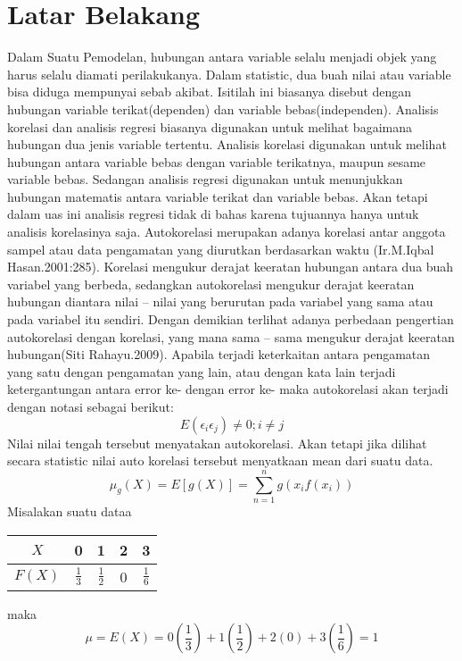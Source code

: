 \documentclass[conference]{IEEEtran}
\begin{document}
\section{Latar Belakang}
Dalam Suatu Pemodelan, hubungan antara variable selalu menjadi objek yang harus selalu diamati perilakukanya. Dalam statistic, dua buah nilai atau variable bisa diduga mempunyai sebab akibat. Isitilah ini biasanya disebut dengan hubungan variable terikat(dependen) dan variable bebas(independen). 
Analisis korelasi dan analisis regresi biasanya digunakan untuk melihat bagaimana hubungan dua jenis variable tertentu. Analisis korelasi digunakan untuk melihat hubungan antara variable bebas dengan variable terikatnya, maupun sesame variable bebas. Sedangan analisis regresi digunakan untuk menunjukkan hubungan matematis antara variable terikat dan variable bebas. Akan tetapi dalam uas  ini analisis regresi tidak di bahas karena tujuannya hanya untuk analisis korelasinya saja.
Autokorelasi merupakan adanya korelasi antar anggota sampel atau data pengamatan yang diurutkan berdasarkan waktu (Ir.M.Iqbal Hasan.2001:285). Korelasi mengukur derajat keeratan hubungan antara dua buah variabel yang berbeda, sedangkan autokorelasi mengukur derajat keeratan hubungan diantara nilai – nilai yang berurutan pada variabel yang sama atau pada variabel itu sendiri. Dengan demikian terlihat adanya perbedaan pengertian autokorelasi dengan korelasi, yang mana sama – sama mengukur derajat keeratan hubungan(Siti Rahayu.2009).
Apabila terjadi keterkaitan antara pengamatan yang satu dengan pengamatan yang lain, atau dengan kata lain terjadi ketergantungan antara error ke- dengan error ke- maka autokorelasi akan terjadi dengan notasi sebagai berikut:
$$E(\epsilon_{i}\epsilon_{j})\neq 0; i \neq j$$
Nilai nilai tengah tersebut menyatakan autokorelasi. Akan tetapi jika dilihat secara statistic nilai auto korelasi tersebut menyatkaan mean dari suatu data.
$$\mu_{g}(X)=E[g(X)]=\sum_{n = 1}^{n} g(x_{i}f(x_{i}))  $$
Misalakan suatu dataa
\begin{table}[h!]
\begin{tabular}{|c|c|c|c|c|}
	\hline
	$X$&0 & 1 &2&3\\
	\hline
	$F(X)$&$\frac{1}{3}$&$\frac{1}{2}$&0&$\frac{1}{6}$\\
	\hline
\end{tabular}
\end{table}
\newline
maka\\
$$\mu = E(X)=0\left(\frac{1}{3}\right)+1\left(\frac{1}{2}\right)+2(0)+3\left(\frac{1}{6}\right)=1$$
\end{document}
